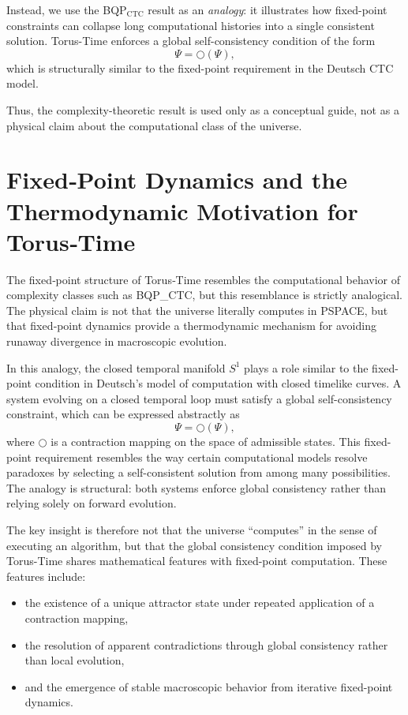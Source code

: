 \documentclass[12pt,openany]{book}
\newcommand{\SingOp}{\bigcirc}
\theoremstyle{plain}
\theoremstyle{definition}
\theoremstyle{remark}
\begin{document}
Instead, we use the BQP$_{\text{CTC}}$ result as an \emph{analogy}: it 
illustrates how fixed-point constraints can collapse long computational 
histories into a single consistent solution. Torus-Time enforces a global 
self-consistency condition of the form
\[
\Psi = \SingOp(\Psi),
\]
which is structurally similar to the fixed-point requirement in the 
Deutsch CTC model.

Thus, the complexity-theoretic result is used only as a conceptual guide, 
not as a physical claim about the computational class of the universe.

\section{Fixed‑Point Dynamics and the Thermodynamic Motivation for Torus‑Time}

The fixed‑point structure of Torus‑Time resembles the computational behavior of complexity classes such as BQP\_CTC, but this resemblance is strictly analogical. The physical claim is not that the universe literally computes in PSPACE, but that fixed‑point dynamics provide a thermodynamic mechanism for avoiding runaway divergence in macroscopic evolution.

In this analogy, the closed temporal manifold $S^1$ plays a role similar to
the fixed-point condition in Deutsch's model of computation with closed
timelike curves. A system evolving on a closed temporal loop must satisfy a
global self-consistency constraint, which can be expressed abstractly as
\[
\Psi = \SingOp(\Psi),
\]
where $\SingOp$ is a contraction mapping on the space of admissible states.
This fixed-point requirement resembles the way certain computational models
resolve paradoxes by selecting a self-consistent solution from among many
possibilities. The analogy is structural: both systems enforce global
consistency rather than relying solely on forward evolution.

The key insight is therefore not that the universe ``computes'' in the sense
of executing an algorithm, but that the global consistency condition imposed
by Torus-Time shares mathematical features with fixed-point computation.
These features include:

\begin{itemize}
    \item the existence of a unique attractor state under repeated
    application of a contraction mapping,
    \item the resolution of apparent contradictions through global
    consistency rather than local evolution,
    \item and the emergence of stable macroscopic behavior from iterative
    fixed-point dynamics.
\end{itemize}
\end{document}
